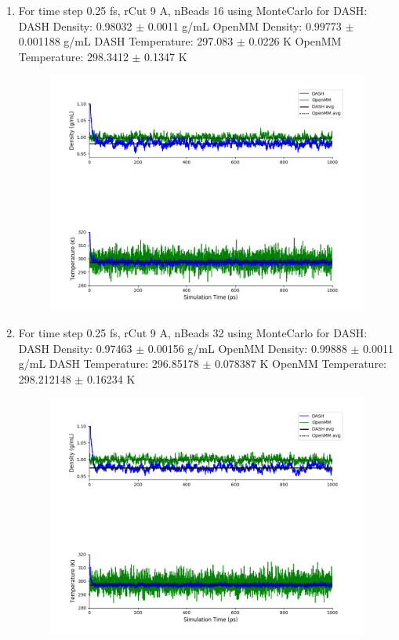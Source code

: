 \documentclass[12pt,reqno]{amsart}
\numberwithin{equation}{section}
\begin{document}
\begin{enumerate}
\item For time step 0.25 fs, rCut 9 A, nBeads 16 using MonteCarlo for DASH:
\subitem DASH Density: 0.98032 $\pm$ 0.0011 g/mL
\subitem OpenMM Density: 0.99773 $\pm$ 0.001188 g/mL
\subitem DASH Temperature: 297.083 $\pm$ 0.0226  K
\subitem OpenMM Temperature:  298.3412 $\pm$ 0.1347 K
\begin{figure}[H]
\centering
\includegraphics[scale=0.7]{MC-MM-nBead16-rCut9-ts025}
\end{figure}

\item For time step 0.25 fs, rCut 9 A, nBeads 32 using MonteCarlo for DASH:
\subitem DASH Density: 0.97463 $\pm$ 0.00156 g/mL
\subitem OpenMM Density: 0.99888 $\pm$ 0.0011 g/mL
\subitem DASH Temperature: 296.85178 $\pm$ 0.078387  K
\subitem OpenMM Temperature:  298.212148 $\pm$ 0.16234 K
\begin{figure}[H]
\centering
\includegraphics[scale=0.7]{MC-MM-nBead32-rCut9-ts025}
\end{figure}


\end{enumerate}
\end{document}
